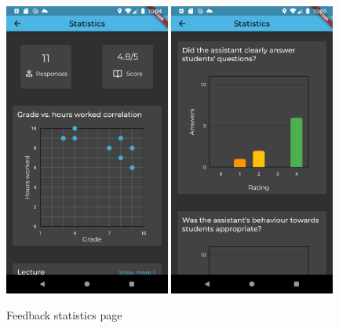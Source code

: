 \begin{figure}[!ht]
\begin{minipage}[t]{0.32\textwidth}
        \end{minipage}
        \hfill
        \begin{minipage}[t]{0.663\textwidth}
            \captionsetup{justification=centering}
            \includegraphics[width=0.485\textwidth]{figures/app/final/feedback_statistics_1.png}
            \includegraphics[width=0.485\textwidth]{figures/app/final/feedback_statistics_2.png}
            \caption{Feedback statistics page}
            \label{4:fig:feedback_statistics}
        \end{minipage}
    \end{figure}
    
